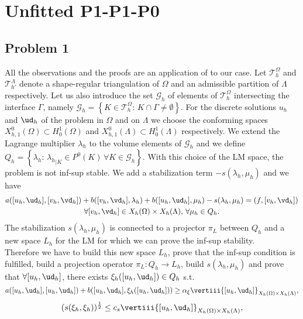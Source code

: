 \section{Unfitted P1-P1-P0}
\subsection{Problem 1} All the observations and the proofs are an application of \cite{burman2014} to our case. Let $\mathcal{T}^{\Omega}_h$ and  $\mathcal{T}^{\Lambda}_{h'}$ denote a shape-regular triangulation  of $\Omega$ and an admissible partition  of $\Lambda$ respectively. Let us also introduce the set $\mathcal{G}_h$ of elements of $\mathcal{T}^{\Omega}_h$ intersecting the interface $\Gamma$, namely $\mathcal{G}_h=\left\{ K\in \mathcal{T}^{\Omega}_h : \, K\cap \Gamma \neq \emptyset \right\}$. For the discrete solutions $u_h$ and ${\ud}_h$ of the problem in $\Omega$ and on $\Lambda$ we choose the conforming spaces $X_{h,1}^0(\Omega)\subset H^1_0(\Omega)$ and  $X_{h,1}^0(\Lambda)\subset H^1_0(\Lambda)$ respectively. We extend the Lagrange multiplier $\lambda_h$ to the volume elements of $\mathcal{G}_h$ and we define $Q_h=\left\{\lambda_h: \, {\lambda_h}_{|K}\in P^0(K)\,  \forall K\in \mathcal{G}_h\right\}$. With this choice of the LM space, the problem is not inf-sup stable. We add a stabilization term $-s(\lambda_h, \mu_h)$ and we have
\begin{multline*}
a([u_h, {\ud}_h], [v_h, {\vd}_h]) + b([v_h, {\vd}_h], \lambda_h) + b([u_h, {\ud}_h], \mu_h) - s(\lambda_h, \mu_h)= (f, [v_h, {\vd}_h])\\
 \forall [v_h, {\vd}_h]\in X_h(\Omega)\times X_h(\Lambda) ,\, \forall \mu_h \in Q_h.
\end{multline*}
The stabilization $s(\lambda_h, \mu_h)$ is connected to a projector $\pi_L$ between $Q_h$ and a new space $L_h$ for the LM for which we can prove the inf-sup stability.\\
Therefore we have to build this new space $L_h$, prove that the inf-sup condition is fulfilled, build a projection operator $\pi_L: Q_h \rightarrow L_h$, build $s(\lambda_h, \mu_h)$ and prove that $\forall [u_h, {\ud}_h]$, there exists $\xi_h([u_h, {\ud}_h]) \in Q_h$ s.t.  
\begin{equation}\label{stab_coercivity}
a([u_h, {\ud}_h],[u_h, {\ud}_h] ) + b([u_h, {\ud}_h], \xi_h([u_h, {\ud}_h])) \geq \alpha_\xi \vertiii{[u_h, {\ud}_h]}_{X_h(\Omega)\times X_h(\Lambda) },
\end{equation}
\begin{equation}\label{stab_stability}
(s(\xi_{h}, \xi_{h}))^{\frac 12} \leq c_s \vertiii{[u_h, {\ud}_h]}_{X_h(\Omega)\times X_h(\Lambda) },
\end{equation}

